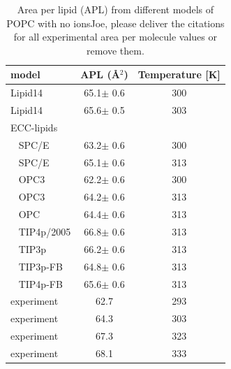\documentclass[journal=jpcbfk]{achemso}
\begin{document}
\begin{table}[!h]
  \caption{Area per lipid (APL) from different models of POPC with no ions\label{tab:apls_si}
  {\color{red}Joe, please deliver the citations for all experimental area per molecule values or remove them.}}
  \begin{tabular}{l|c c}
    model          & APL (\AA$^2$)   & Temperature [K] \\
    \hline
    Lipid14                   & 65.1$\pm$ 0.6  &  300 \\
    Lipid14 \cite{dickson14}  & 65.6$\pm$ 0.5  &  303 \\
    \hline
    ECC-lipids &        &  \\
    ~ SPC/E          & 63.2$\pm$ 0.6   &  300       \\
    ~ SPC/E          & 65.1$\pm$ 0.6   &  313       \\
    ~ OPC3           & 62.2$\pm$ 0.6   &  300       \\
    ~ OPC3           & 64.2$\pm$ 0.6   &  313       \\
    ~ OPC            & 64.4$\pm$ 0.6   &  313       \\
    ~ TIP4p/2005     & 66.8$\pm$ 0.6   &  313       \\
    ~ TIP3p          & 66.2$\pm$ 0.6   &  313       \\
    ~ TIP3p-FB       & 64.8$\pm$ 0.6   &  313       \\
    ~ TIP4p-FB       & 65.6$\pm$ 0.6   &  313       \\
    \hline
    experiment   & 62.7  &  293    \\
    experiment \cite{kucerka11} & 64.3  &  303    \\
    experiment  & 67.3  &  323    \\
    experiment  & 68.1  &  333    \\
    \hline
  \end{tabular} \\
\end{table}
\end{document}
